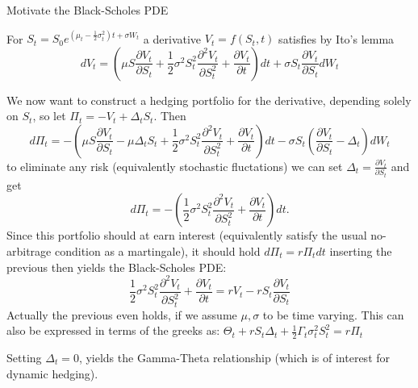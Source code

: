 Motivate the Black-Scholes PDE

For \( S_t = S_0e^{(\mu_t - \frac{1}{2}\sigma_t^2)t + \sigma W_t} \) a derivative \( V_t = f(S_t, t) \) satisfies
by Ito's lemma 
\[ dV_t = (\mu S \frac{\partial V_t}{\partial S_t} + \frac{1}{2} \sigma^2 S_t^2 \frac{\partial^2 V_t}{\partial S_t^2} + \frac{\partial V_t}{\partial t}) dt + \sigma S_t \frac{\partial V_t}{\partial S_t} dW_t 
\]

We now want to construct a hedging portfolio for the derivative, depending solely on \( S_t \), so let \( \Pi_t = -V_t + \Delta_t S_t \).
Then 
\[
d\Pi_t = - (\mu S \frac{\partial V_t}{\partial S_t} - \mu \Delta_t S_t + \frac{1}{2} \sigma^2 S_t^2 \frac{\partial^2 V_t}{\partial S_t^2} + \frac{\partial V_t}{\partial t}) dt - \sigma S_t(\frac{\partial V_t}{\partial S_t} - \Delta_t) dW_t
\]
to eliminate any risk (equivalently stochastic fluctations) we can set \( \Delta_t = \frac{\partial V_t}{\partial S_t} \)
and get
\[
d\Pi_t = - (\frac{1}{2} \sigma^2 S_t^2 \frac{\partial^2 V_t}{\partial S_t^2} + \frac{\partial V_t}{\partial t})dt.
\]
Since this portfolio should at earn interest (equivalently satisfy the usual no-arbitrage condition as a martingale), it should hold
\( d\Pi_t = r \Pi_t dt \)
inserting the previous then yields the Black-Scholes PDE:
\[
\frac{1}{2} \sigma^2 S_t^2 \frac{\partial^2 V_t}{\partial S_t^2} + \frac{\partial V_t}{\partial t} = r V_t - r S_t \frac{\partial V_t}{\partial S_t}
\]
Actually the previous even holds, if we assume \( \mu, \sigma \) to be time varying.
This can also be expressed in terms of the greeks as:
\( \Theta_t + rS_t \Delta_t + \frac{1}{2} \Gamma_t \sigma^2_t S^2_t = r\Pi_t \)

Setting \( \Delta_t = 0 \), yields the Gamma-Theta relationship (which is of interest for dynamic hedging). 

